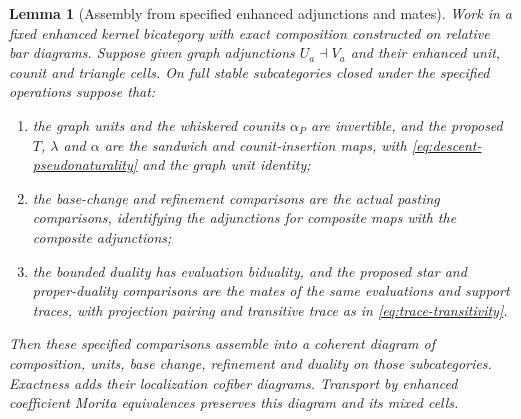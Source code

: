 \documentclass[11pt]{article}
\newtheorem{lemma}[proposition]{Lemma}
\theoremstyle{definition}
\theoremstyle{remark}
\begin{document}
\begin{lemma}[Assembly from specified enhanced adjunctions and mates]
\label{lem:coherent-assembly}
Work in a fixed enhanced kernel bicategory with exact composition
constructed on relative bar diagrams.  Suppose given graph
adjunctions $U_a\dashv V_a$ and their enhanced unit, counit and
triangle cells.  On full stable subcategories closed under the
specified operations suppose that:
\begin{enumerate}
\item the graph units and the whiskered counits $\alpha_P$ are
invertible, and the proposed $T$, $\lambda$ and $\alpha$ are the
sandwich and counit-insertion maps, with
\eqref{eq:descent-pseudonaturality} and the graph unit identity;
\item the base-change and refinement comparisons are the actual
pasting comparisons, identifying the adjunctions for composite maps
with the composite adjunctions;
\item the bounded duality has evaluation biduality, and the proposed
star and proper-duality comparisons are the mates of the same
evaluations and support traces, with projection pairing and
transitive trace as in \eqref{eq:trace-transitivity}.
\end{enumerate}
Then these specified comparisons assemble into a coherent diagram
of composition, units, base change, refinement and duality on those
subcategories.  Exactness adds their localization cofiber diagrams.
Transport by enhanced coefficient Morita equivalences preserves
this diagram and its mixed cells.
\end{lemma}
\end{document}
